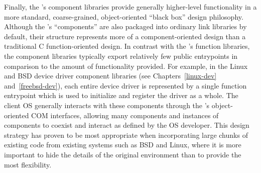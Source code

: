 Finally, the \oskit's component libraries
provide generally higher-level functionality
in a more standard, coarse-grained, object-oriented
``black box'' design philosophy.
Although the \oskit's ``components''
are also packaged into ordinary link libraries by default,
their structure represents more of a component-oriented design
than a traditional C function-oriented design.
In contrast with the \oskit's function libraries,
the component libraries
typically export relatively few public entrypoints
in comparison to the amount of functionality provided.
For example, in the Linux and BSD device driver component libraries
(see Chapters~\ref{linux-dev} and~\ref{freebsd-dev}),
each entire device driver is represented by
a single function entrypoint
which is used to initialize and register the driver as a whole.
The client OS generally interacts with these components
through the \oskit's object-oriented COM interfaces,
allowing many components and instances of components
to coexist and interact as defined by the OS developer.
This design strategy has proven to be most appropriate
when incorporating large chunks of existing code
from existing systems such as BSD and Linux,
where it is more important
to hide the details of the original environment
than to provide the most flexibility.

